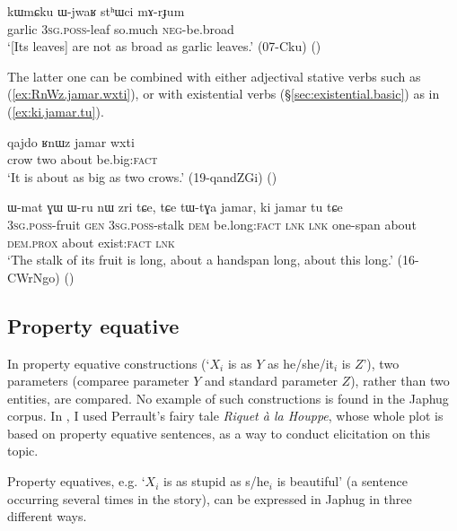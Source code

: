 \begin{exe}
\ex \label{ex:sthWci.mArJum}
\gll kɯmɕku ɯ-jwaʁ stʰɯci mɤ-rɟum \\
garlic \textsc{3sg}.\textsc{poss}-leaf so.much \textsc{neg}-be.broad \\
\glt `[Its leaves] are not as broad as garlic leaves.' (07-Cku)
()
\end{exe}

The latter one   can be combined with either adjectival stative verbs such as  (\ref{ex:RnWz.jamar.wxti}), or with existential verbs (§\ref{sec:existential.basic}) as in (\ref{ex:ki.jamar.tu}).
 
\begin{exe}
\ex \label{ex:RnWz.jamar.wxti}
\gll qajdo ʁnɯz jamar wxti \\
crow two about be.big:\textsc{fact} \\
\glt `It is about as big as two crows.' (19-qandZGi)
()
\end{exe}

\begin{exe}
\ex \label{ex:ki.jamar.tu}
\gll ɯ-mat ɣɯ ɯ-ru nɯ zri tɕe, tɕe tɯ-tɣa jamar, ki jamar tu tɕe \\
\textsc{3sg}.\textsc{poss}-fruit \textsc{gen} \textsc{3sg}.\textsc{poss}-stalk \textsc{dem} be.long:\textsc{fact} \textsc{lnk} \textsc{lnk} one-span about \textsc{dem}.\textsc{prox} about exist:\textsc{fact} \textsc{lnk} \\
\glt `The stalk of its fruit is long, about a handspan long, about this long.' (16-CWrNgo)
()
\end{exe}
 

\subsection{Property equative}
In property equative constructions (`$X_i$ is as $Y$ as he/she/it$_i$ is $Z$'),  two parameters (comparee parameter $Y$ and standard parameter $Z$), rather than two entities, are compared. No example of such constructions is found in the Japhug corpus. In \citet{jacques18similative}, I used Perrault's fairy tale \textit{Riquet à la Houppe}, whose whole plot is based on property equative sentences, as a way to conduct elicitation on this topic.

Property equatives, e.g. `$X_i$ is as stupid as s/he$_i$ is beautiful' (a sentence occurring several times in the story), can be expressed in Japhug in three different ways.

